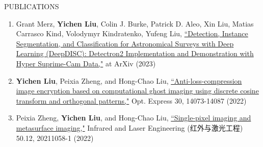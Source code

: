 \documentclass[11pt]{article}
\begin{document}
\begin{section}{PUBLICATIONS}
    
\begin{enumerate}[leftmargin=1.5em]
    \item Grant Merz, \textbf{Yichen Liu}, Colin J. Burke, Patrick D. Aleo, Xin Liu, Matias Carrasco Kind, Volodymyr Kindratenko, Yufeng Liu, \href{https://arxiv.org/abs/2307.05826}{``Detection, Instance Segmentation, and Classification for Astronomical Surveys with Deep Learning (DeepDISC): Detectron2 Implementation and Demonstration with Hyper Suprime-Cam Data,"} at ArXiv (2023)
    \item \textbf{Yichen Liu}, Peixia Zheng, and Hong-Chao Liu, \href{https://opg.optica.org/oe/fulltext.cfm?uri=oe-30-9-14073&id=471300}{``Anti-loss-compression image encryption based on computational ghost imaging using discrete cosine transform and orthogonal patterns,"} Opt. Express 30, 14073-14087 (2022)
    \item Peixia Zheng, \textbf{Yichen Liu}, and Hong-Chao Liu, \href{http://www.irla.cn/cn/article/doi/10.3788/IRLA20211058}{``Single-pixel imaging and metasurface imaging,"} Infrared and Laser Engineering (红外与激光工程) 50.12, 20211058-1 (2022)
\end{enumerate}

\end{section}
\end{document}
